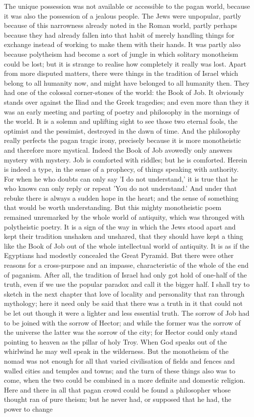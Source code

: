 The unique possession was not available or accessible to the pagan world, because it was also the possession of a jealous people. The Jews were unpopular, partly because of this narrowness already noted in the Roman world, partly perhaps because they had already fallen into that habit of merely handling things for exchange instead of working to make them with their hands. It was partly also because polytheism had become a sort of jungle in which solitary monotheism could be lost; but it is strange to realise how completely it really was lost. Apart from more disputed matters, there were things in the tradition of Israel which belong to all humanity now, and might have belonged to all humanity then. They had one of the colossal corner-stones of the world: the Book of Job. It obviously stands over against the Iliad and the Greek tragedies; and even more than they it was an early meeting and parting of poetry and philosophy in the mornings of the world. It is a solemn and uplifting sight to see those two eternal fools, the optimist and the pessimist, destroyed in the dawn of time. And the philosophy really perfects the pagan tragic irony, precisely because it is more monotheistic and therefore more mystical. Indeed the Book of Job avowedly only answers mystery with mystery. Job is comforted with riddles; but he is comforted. Herein is indeed a type, in the sense of a prophecy, of things speaking with authority. For when he who doubts can only say 'I do not understand,' it is true that he who knows can only reply or repeat 'You do not understand.' And under that rebuke there is always a sudden hope in the heart; and the sense of something that would be worth understanding. But this mighty monotheistic poem remained unremarked by the whole world of antiquity, which was thronged with polytheistic poetry. It is a sign of the way in which the Jews stood apart and kept their tradition unshaken and unshared, that they should have kept a thing like the Book of Job out of the whole intellectual world of antiquity. It is as if the Egyptians had modestly concealed the Great Pyramid. But there were other reasons for a cross-purpose and an impasse, characteristic of the whole of the end of paganism. After all, the tradition of Israel had only got hold of one-half of the truth, even if we use the popular paradox and call it the bigger half. I shall try to sketch in the next chapter that love of locality and personality that ran through mythology; here it need only be said that there was a truth in it that could not be let out though it were a lighter and less essential truth. The sorrow of Job had to be joined with the sorrow of Hector; and while the former was the sorrow of the universe the latter was the sorrow of the city; for Hector could only stand pointing to heaven as the pillar of holy Troy. When God speaks out of the whirlwind he may well speak in the wilderness. But the monotheism of the nomad was not enough for all that varied civilisation of fields and fences and walled cities and temples and towns; and the turn of these things also was to come, when the two could be combined in a more definite and domestic religion. Here and there in all that pagan crowd could be found a philosopher whose thought ran of pure theism; but he never had, or supposed that he had, the power to change 